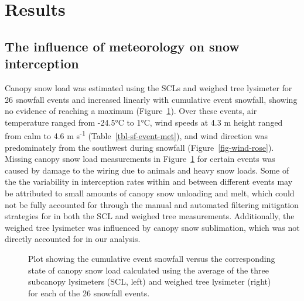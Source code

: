 \documentclass[
  letterpaper,
  DIV=11,
  numbers=noendperiod]{scrartcl}
\begin{document}
\section{Results}\label{results}

\subsection{The influence of meteorology on snow
interception}\label{the-influence-of-meteorology-on-snow-interception}

Canopy snow load was estimated using the SCLs and weighed tree lysimeter
for 26 snowfall events and increased linearly with cumulative event
snowfall, showing no evidence of reaching a maximum
(Figure~\ref{fig-scl-w-sf}). Over these events, air temperature ranged
from -24.5°C to 1°C, wind speeds at 4.3 m height ranged from calm to 4.6
m s\textsuperscript{-1} (Table~\ref{tbl-sf-event-met}), and wind
direction was predominately from the southwest during snowfall
(Figure~\ref{fig-wind-rose}). Missing canopy snow load measurements in
Figure~\ref{fig-scl-w-sf} for certain events was caused by damage to the
wiring due to animals and heavy snow loads. Some of the the variability
in interception rates within and between different events may be
attributed to small amounts of canopy snow unloading and melt, which
could not be fully accounted for through the manual and automated
filtering mitigation strategies for in both the SCL and weighed tree
measurements. Additionally, the weighed tree lysimeter was influenced by
canopy snow sublimation, which was not directly accounted for in our
analysis.

\begin{figure}[H]


\caption{\label{fig-scl-w-sf}Plot showing the cumulative event snowfall
versus the corresponding state of canopy snow load calculated using the
average of the three subcanopy lysimeters (SCL, left) and weighed tree
lysimeter (right) for each of the 26 snowfall events.}

\end{figure}%
\end{document}
